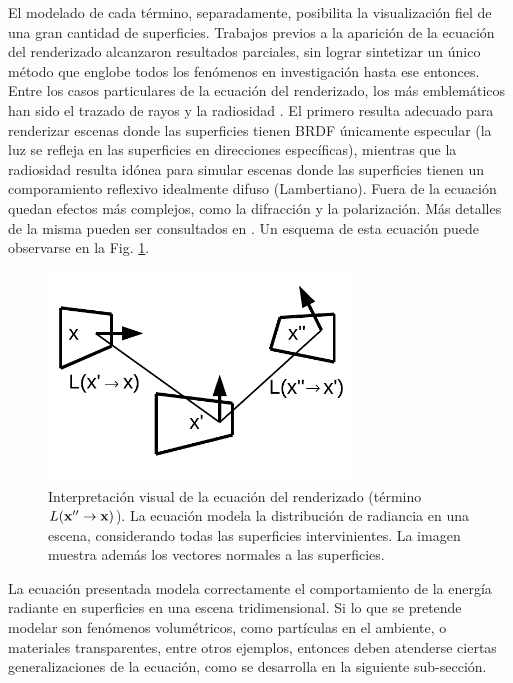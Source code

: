 El modelado de cada término, separadamente, posibilita la visualización fiel de una gran cantidad de superficies.
Trabajos previos a la aparición de la ecuación del renderizado alcanzaron resultados parciales, sin lograr sintetizar un único método que englobe todos los fenómenos en investigación hasta ese entonces.
Entre los casos particulares de la ecuación del renderizado, los más emblemáticos han sido el trazado de rayos \cite{Whitted1980} y la radiosidad \cite{Goral1984}.
El primero resulta adecuado para renderizar escenas donde las superficies tienen BRDF únicamente especular (la luz se refleja en las superficies en direcciones específicas), mientras que la radiosidad resulta idónea para simular escenas donde las superficies tienen un comporamiento reflexivo idealmente difuso (Lambertiano).
Fuera de la ecuación quedan efectos más complejos, como la difracción y la polarización.
Más detalles de la misma pueden ser consultados en \cite{Kajiya1986}.
Un esquema de esta ecuación puede observarse en la Fig. \ref{fg:rendequation}.

\begin{figure}
\center
\includegraphics[width=8cm]{figures/rendequation}
\caption[Interpretación visual de la ecuación del renderizado]{Interpretación visual de la ecuación del renderizado (término $L(\bold{x''}  \rightarrow \bold{x}) $). La ecuación modela la distribución de radiancia en una escena, considerando todas las superficies intervinientes. La imagen muestra además los vectores normales a las superficies.}
\label{fg:rendequation}
\end{figure}

La ecuación presentada modela correctamente el comportamiento de la energía radiante en superficies en una escena tridimensional.
Si lo que se pretende modelar son fenómenos volumétricos, como partículas en el ambiente, o materiales transparentes, entre otros ejemplos, entonces deben atenderse ciertas generalizaciones de la ecuación, como se desarrolla en la siguiente sub-sección.

